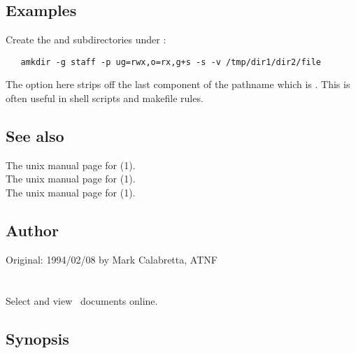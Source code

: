 \subsection*{Examples}

Create the  and  subdirectories under :

\begin{verbatim}
   amkdir -g staff -p ug=rwx,o=rx,g+s -s -v /tmp/dir1/dir2/file
\end{verbatim}

\noindent
The  option here strips off the last component of the pathname which
is .  This is often useful in shell scripts and makefile rules.

\subsection*{See also}

The unix manual page for (1).\\
The unix manual page for (1).\\
The unix manual page for (1).

\subsection*{Author}

Original: 1994/02/08 by Mark Calabretta, ATNF


\newpage
\section{}
\label{dox}

Select and view \aipspp\ documents online.

\subsection*{Synopsis}

\begin{synopsis}
\end{synopsis}

